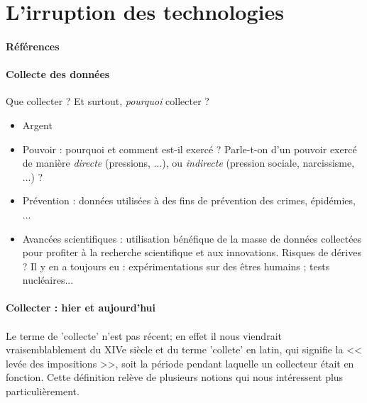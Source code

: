 \section{L'irruption des technologies}
\paragraph{Références} \cite{Damasio0} \cite{Marx1} \cite{TechnoSocio0} \cite{GhostInTheShell}

\paragraph{Collecte des données} Que collecter ? Et surtout, \emph{pourquoi} collecter ?
\begin{itemize}
    \item Argent
    \item Pouvoir : pourquoi et comment est-il exercé ? Parle-t-on d'un pouvoir exercé de
    manière \emph{directe} (pressions, ...), ou \emph{indirecte} (pression sociale,
    narcissisme, ...) ?
    \item Prévention : données utilisées à des fins de prévention des crimes, épidémies, ...
    \item Avancées scientifiques : utilisation bénéfique de la masse de données collectées
    pour profiter à la recherche scientifique et aux innovations. Risques de dérives ? Il y
    en a toujours eu : expérimentations sur des êtres humains ; tests nucléaires... 
\end{itemize}

\paragraph{Collecter : hier et aujourd'hui}

\paragraph{} Le terme de 'collecte' n'est pas récent; en effet il nous viendrait vraisemblablement
du XIVe siècle et du terme 'collete' en latin, qui signifie la << levée des impositions >>, soit
la période pendant laquelle un collecteur était en fonction. Cette définition relève de plusieurs notions
qui nous intéressent plus particulièrement.

